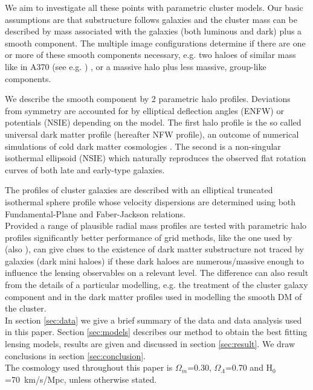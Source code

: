 \documentclass[useAMS,usenatbib]{mn2e}
\newcounter{one}   \setcounter{one}{1}
\newcounter{two}   \setcounter{two}{2}
\begin{document}
We aim to investigate all these points with parametric cluster
models. Our basic assumptions are that substructure follows galaxies
and the cluster mass can be described by mass associated with the
galaxies (both luminous and dark) plus a smooth component. The
multiple image configurations determine if there are one or more of
these smooth components necessary, e.g. two haloes of similar mass
like in A370 (see e.g. \citet{kneib:93,abdelsalam:98}) , or a massive
halo plus less massive, group-like components.

We describe the smooth component by 2 parametric halo
profiles. Deviations from symmetry are accounted for by elliptical
deflection angles (ENFW) or potentials (NSIE) depending on the
model. The first halo profile is the so called universal dark matter
profile (hereafter NFW profile), an outcome of numerical simulations
of cold dark matter cosmologies \citep{navarro:96}. The second is a
non-singular isothermal ellipsoid (NSIE) which naturally reproduces
the observed flat rotation curves of both late and early-type
galaxies.

The profiles of cluster galaxies are described with an elliptical
truncated isothermal sphere profile \citep{blandford:87} whose
velocity dispersions are determined using both Fundamental-Plane and
Faber-Jackson relations.\\

Provided a range of plausible radial mass profiles are tested with
parametric halo profiles significantly better performance of grid
methods, like the one used by \citet{broadhurst:05} (also
\citet{diego:05a,diego:05b}), can give clues to the existence of dark
matter substructure not traced by galaxies (dark mini haloes) if these
dark haloes are numerous/massive enough to influence the lensing
observables on a relevant level. The difference can also result from
the details of a particular modelling, e.g. the treatment of the
cluster galaxy component and in the dark matter profiles used in
modelling the smooth DM of the cluster.\\

In section \ref{sec:data} we give a brief summary of the data and data
analysis used in this paper. Section \ref{sec:models} describes our
method to obtain the best fitting lensing models, results are given
and discussed in section \ref{sec:result}. We draw conclusions in
section \ref{sec:conclusion}.\\

The cosmology used throughout this paper is $\Omega_{m}$=0.30,
$\Omega_{\Lambda}$=0.70 and H$_{0}$=70~km/s/Mpc, unless otherwise
stated.
\end{document}
